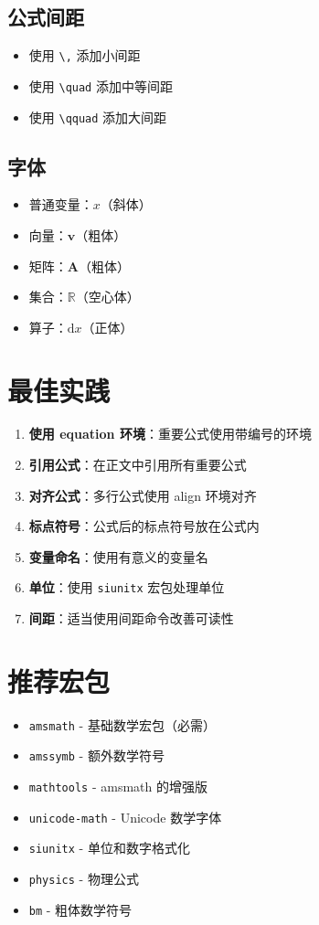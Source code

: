 \subsection{公式间距}

\begin{itemize}
  \item 使用 \texttt{\textbackslash,} 添加小间距
  \item 使用 \texttt{\textbackslash quad} 添加中等间距
  \item 使用 \texttt{\textbackslash qquad} 添加大间距
\end{itemize}

\subsection{字体}

\begin{itemize}
  \item 普通变量：$x$（斜体）
  \item 向量：$\mathbf{v}$（粗体）
  \item 矩阵：$\mathbf{A}$（粗体）
  \item 集合：$\mathbb{R}$（空心体）
  \item 算子：$\mathrm{d}x$（正体）
\end{itemize}

\section{最佳实践}

\begin{enumerate}
  \item \textbf{使用 equation 环境}：重要公式使用带编号的环境
  \item \textbf{引用公式}：在正文中引用所有重要公式
  \item \textbf{对齐公式}：多行公式使用 align 环境对齐
  \item \textbf{标点符号}：公式后的标点符号放在公式内
  \item \textbf{变量命名}：使用有意义的变量名
  \item \textbf{单位}：使用 \texttt{siunitx} 宏包处理单位
  \item \textbf{间距}：适当使用间距命令改善可读性
\end{enumerate}

\section{推荐宏包}

\begin{itemize}
  \item \texttt{amsmath} - 基础数学宏包（必需）
  \item \texttt{amssymb} - 额外数学符号
  \item \texttt{mathtools} - amsmath 的增强版
  \item \texttt{unicode-math} - Unicode 数学字体
  \item \texttt{siunitx} - 单位和数字格式化
  \item \texttt{physics} - 物理公式
  \item \texttt{bm} - 粗体数学符号
\end{itemize}
